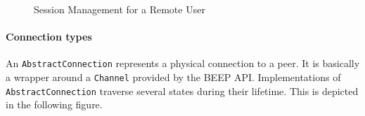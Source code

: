 \begin{figure}[H]
 \centering
 \caption{Session Management for a Remote User}
 \label{fig:network.discovery.sessionmanagement}
\end{figure}


\paragraph{Connection types}
An \texttt{AbstractConnection} represents a physical connection to a peer. It is basically a wrapper around a \texttt{Channel} provided by the BEEP API. Implementations of \texttt{AbstractConnection} traverse several states during their lifetime. This is depicted in the following figure.

